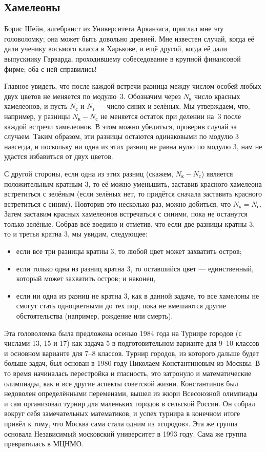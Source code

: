 \subsection*{Хамелеоны}

Борис Шейн, алгебраист из Университета Арканзаса, прислал мне эту головоломку; она может быть довольно древней.
Мне известен случай, когда её дали ученику восьмого класса в Харькове,
и ещё другой, когда её дали выпускнику Гарварда, проходившему собеседование в крупной финансовой фирме;
оба с ней справились!

Главное увидеть, что после каждой встречи разница между числом особей любых двух цветов не меняется по модулю~3.
Обозначим через $N_{\text{к}}$ число красных хамелеонов, и пусть
$N_{\text{с}}$ и $N_{\text{з}}$ --- число синих и зелёных.
Мы утверждаем, что, например, у разницы $N_{\text{к}} - N_{\text{с}}$ не меняется остаток при делении на~$3$ после каждой встречи хамелеонов.
В этом можно убедиться, проверив случай за случаем.
Таким образом, эти разницы остаются одинаковыми по модулю 3 навсегда, и поскольку ни одна из этих разниц не равна нулю по модулю 3, нам не удастся избавиться от двух цветов.

С другой стороны, если одна из этих разниц (скажем, $N_{\text{к}} - N_{\text{с}}$) является положительным кратным $3$, то её можно уменьшить, заставив красного хамелеона встретиться с зелёным (если зелёных нет, то придётся сначала заставить красного встретиться с синим).
Повторив это несколько раз, можно добиться, что $N_{\text{к}} = N_{\text{с}}$.
Затем заставим красных хамелеонов встречаться с синими, пока не останутся только зелёные.
Собрав всё воедино и отметив, что если две разницы кратны $3$, то и третья кратна $3$, мы увидим, следующее:
\begin{itemize}
\item если все три разницы кратны 3, то любой цвет может захватить остров;
\item если только одна из разниц кратна 3, то оставшийся цвет --- единственный, который может захватить остров; и наконец,
\item если ни одна из разниц не кратна 3, как в данной задаче, то все хамелоны не смогут стать одноцветными до тех пор, пока не вмешаются другие обстоятельства (например, рождение или смерть).
\end{itemize}

Эта головоломка была предложена осенью 1984 года на Турнире городов (с числами 13, 15 и 17) как задача 5 в подготовительном варианте для 9--10 классов и основном варианте для 7--8 классов.
Турнир городов, из которого дальше будет больше задач, был основан в 1980 году Николаем Константиновым из Москвы.
В то время начиналась перестройка и гласность, это затронуло и математические олимпиады, как и все другие аспекты советской жизни.
Константинов был недоволен определёнными переменами, вышел из жюри Всесоюзной олимпиады и сам организовал турнир для маленьких городов в сельской России.
Он собрал вокруг себя замечательных математиков, и успех турнира в конечном итоге привёл к тому, что Москва сама стала одним из «городов».
Эта же группа основала Независимый московский университет в 1993 году.
Сама же группа превратилась в МЦНМО.


